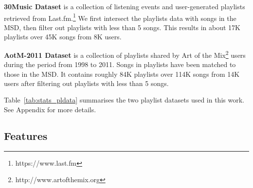 

\noindent
{\bf 30Music Dataset} is a collection of listening events and user-generated
playlists retrieved from Last.fm.\footnote{https://www.last.fm}
We first intersect the playlists data with songs in the MSD, 
then filter out playlists with less than 5 songs.
This results in about 17K playlists over 45K songs from 8K users.

\noindent
{\bf AotM-2011 Dataset} is a collection of playlists shared by Art of the Mix\footnote{http://www.artofthemix.org} 
users during the period from 1998 to 2011. Songs in playlists have been matched to those in the MSD.
It contains 
roughly 84K playlists over 114K songs from 14K users
after filtering out playlists with less than 5 songs.

Table~\ref{tab:stats_pldata} summarises the two 
playlist datasets used in this work.
See Appendix for more details.


\subsection{Features}


